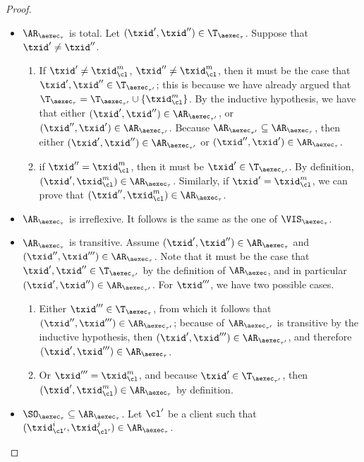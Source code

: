 \begin{proof}
\begin{itemize}
\begin{itemize}
\item $\AR_{\aexec_{\tau}}$ is total. Let $(\txid', \txid'') \in \T_{\aexec_{\tau}}$. 
Suppose that $\txid' \neq \txid''$.
\begin{enumerate}
\item If $\txid' \neq 
\txid_{\cl}^{m}$, $\txid'' \neq \txid_{\cl}^{m}$, then it must be the case that $\txid', \txid'' \in \T_{\aexec_{\tau'}}$; 
this is because we have already argued that $\T_{\aexec_{\tau}} = \T_{\aexec_{\tau'}} \cup \{\txid_{\cl}^{m}\}$. 
By the inductive hypothesis, we have that either $(\txid', \txid'') \in \AR_{\aexec_{\tau'}}$, or 
$(\txid'', \txid') \in \AR_{\aexec_{\tau'}}$. Because $\AR_{\aexec_{\tau'}} \subseteq \AR_{\aexec_{\tau}}$, 
then either $(\txid', \txid'') \in \AR_{\aexec_{\tau'}}$ or $(\txid'', \txid') \in \AR_{\aexec_{\tau}}$. 
\item if $\txid'' = \txid_{\cl}^{m}$, then it must be $\txid' \in \T_{\aexec_{\tau'}}$. By definition, 
$(\txid', \txid_{\cl}^{m}) \in \AR_{\aexec_{\tau}}$. Similarly, if $\txid' = \txid_{\cl}^{m}$, we 
can prove that $(\txid'', \txid_{\cl}^{m}) \in \AR_{\aexec_{\tau}}$.
\end{enumerate}
\item  $\AR_{\aexec_{\tau}}$ is irreflexive. It follows is the same as the one of $\VIS_{\aexec_{\tau}}$.
\item \( \AR_{\aexec_{\tau}} \) is transitive.
Assume $(\txid', \txid'') \in \AR_{\aexec_{\tau}}$ and $(\txid'', \txid''') \in \AR_{\aexec_{\tau}}$. 
Note that it must be the case that $\txid', \txid'' \in \T_{\aexec_{\tau'}}$ by the definition of 
$\AR_{\aexec}$, and in particular $(\txid', \txid'') \in \AR_{\aexec_{\tau'}}$. 
For $\txid'''$, we have two possible cases. 
\begin{enumerate}
\item Either $\txid''' \in \T_{\aexec_{\tau}}$, from 
which it follows that $(\txid'', \txid''') \in \AR_{\aexec_{\tau'}}$; because
of $\AR_{\aexec_{\tau'}}$ is transitive by the inductive hypothesis, then 
$(\txid', \txid''') \in \AR_{\aexec_{\tau'}}$, and therefore $(\txid' ,\txid''') \in 
\AR_{\aexec_{\tau}}$.
\item Or $\txid''' = \txid_{\cl}^{m}$, and because $\txid' \in \T_{\aexec_{\tau'}}$, then 
$(\txid', \txid_{\cl}^{m}) \in \AR_{\aexec_{\tau}}$ by definition. 
\end{enumerate}
\item \( \SO_{\aexec_{\tau}} \subseteq \AR_{\aexec_{\tau}} \).
Let $\cl'$ be a client such that $(\txid_{\cl'}^{i}, \txid_{\cl'}^{j}) \in \AR_{\aexec_{\tau}}$. 

\end{itemize}
\end{itemize}
\end{proof}
